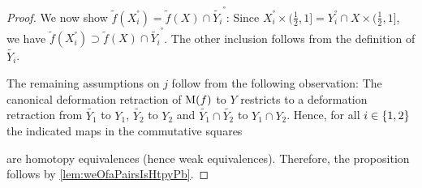 \begin{lemma}
\begin{proof}
        We now show $\widetilde{f}(X_i^°)=\widetilde{f}(X)\cap \widetilde{Y_i}^°$: 
        Since $X_i^°\times(\frac{1}{2},1]=Y_i^°\cap X\times(\frac{1}{2},1]$, we have $\widetilde{f}(X_i^°)\supset \widetilde{f}(X)\cap \widetilde{Y_i}^°$.
        The other inclusion follows from the definition of $\widetilde{Y_i}$.

        The remaining assumptions on $j$ follow from the following observation: 
        The canonical deformation retraction of $\operatorname{M}(f)$ to $Y$ restricts to a deformation retraction from $\widetilde{Y_1}$ to $Y_1$, $\widetilde{Y_2}$ to $Y_2$ and $\widetilde{Y_1}\cap\widetilde{Y_2}$ to $Y_1\cap Y_2$.
        Hence, for all $i\in\left\lbrace1,2\right\rbrace$ the indicated maps in the commutative squares
        \begin{center} 
        \end{center} 
        are homotopy equivalences (hence weak equivalences).
        Therefore, the proposition follows by \cref{lem:weOfaPairsIsHtpyPb}.
    \end{proof}
\end{lemma}
